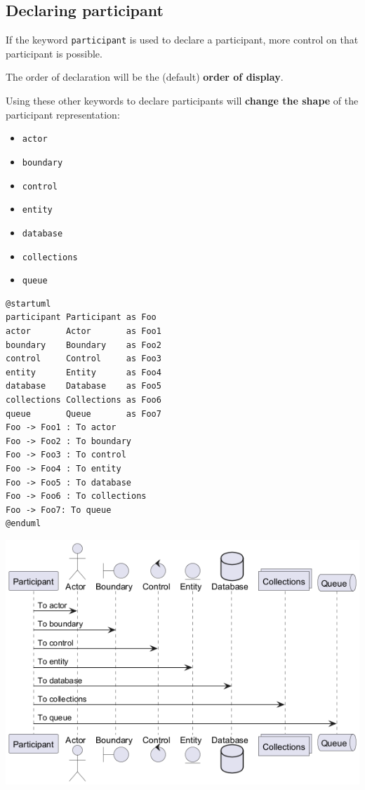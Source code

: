 \subsection{Declaring participant}


If the keyword \texttt{participant} is used to declare a participant, more control on that participant is possible.


The order of declaration will be the (default) \textbf{order of display}.


Using these other keywords to declare participants will \textbf{change the shape} of the participant representation:
\begin{itemize}
\item \texttt{actor}
\item \texttt{boundary}
\item \texttt{control}
\item \texttt{entity}
\item \texttt{database}
\item \texttt{collections}
\item \texttt{queue}
\end{itemize}


\begin{verbatim}
@startuml
participant Participant as Foo
actor       Actor       as Foo1
boundary    Boundary    as Foo2
control     Control     as Foo3
entity      Entity      as Foo4
database    Database    as Foo5
collections Collections as Foo6
queue       Queue       as Foo7
Foo -> Foo1 : To actor 
Foo -> Foo2 : To boundary
Foo -> Foo3 : To control
Foo -> Foo4 : To entity
Foo -> Foo5 : To database
Foo -> Foo6 : To collections
Foo -> Foo7: To queue
@enduml
\end{verbatim}
\begin{center}
\includegraphics[scale=0.60]{imgw/img-aab53771966850933e74522259169424.png}
\end{center}


